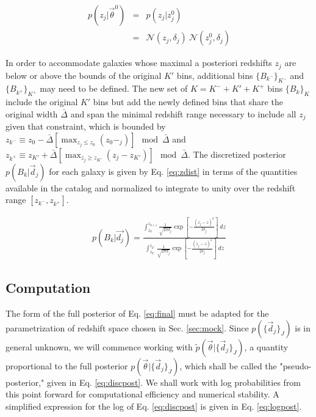 \documentclass[preprint]{aastex}
\begin{document}
\begin{eqnarray}
\label{eq:interim}
p(z_{j}|\vec{\theta}^{0}) &=& p(z_{j}|z^{0}_{j})\\
&=& \mathcal{N}(z_{j},\delta_{j})\ \mathcal{N}(z_{j}^{0},\delta_{j})
\end{eqnarray}

In order to accommodate galaxies whose maximal a posteriori redshifts $z_{j}$ are below or above the bounds of the original $K'$ bins, additional bins $\{B_{k^{-}}\}_{K^{-}}$ and $\{B_{k^{+}}\}_{K^{+}}$ may need to be defined.  The new set of $K=K^{-}+K'+K^{+}$ bins $\{B_{k}\}_{K}$ include the original $K'$ bins but add the newly defined bins that share the original width $\bar{\Delta}$ and span the minimal redshift range necessary to include all $z_{j}$ given that constraint, which is bounded by $z_{k^{-}}\equiv z_{0}-\bar{\Delta}[\max_{z_{j}\leq z_{0}}(z_{0}-_{j})]\mod\bar{\Delta}$ and $z_{k^{+}}\equiv z_{K'}+\bar{\Delta}[\max_{z_{j}\geq z_{K'}}(z_{j}-z_{K'})]\mod\bar{\Delta}$.  The discretized posterior $p(B_{k}|\vec{d}_{j})$ for each galaxy is given by Eq. \ref{eq:zdist} in terms of the quantities available in the catalog and normalized to integrate to unity over the redshift range $[z_{k^{-}},z_{k^{+}}]$.  

\begin{eqnarray}
\label{eq:zdist}
p(B_{k}|\vec{d_{j}}) = \frac{\int_{z_{k}}^{z_{k+1}} \frac{1}{\sqrt{2\pi\delta_{j}}}\exp\left[-\frac{(z_{j}-z)^{2}}{2\delta_{j}}\right]\ dz}{\int_{z_{k^{-}}}^{z_{k^{+}}} \frac{1}{\sqrt{2\pi\delta_{j}}}\exp\left[-\frac{(z_{j}-z)^{2}}{2\delta_{j}}\right]\ dz}
\end{eqnarray}

\clearpage
\subsection{Computation}
\label{sec:mcmc}

The form of the full posterior of Eq. \ref{eq:final} must be adapted for the parametrization of redshift space chosen in Sec. \ref{sec:mock}.  Since $p(\{\vec{d}_{j}\}_{J})$ is in general unknown, we will commence working with $\tilde{p}(\vec{\theta}|\{\vec{d}_{j}\}_{J})$, a quantity proportional to the full posterior $p(\vec{\theta}|\{\vec{d}_{j}\}_{J})$, which shall be called the "pseudo-posterior," given in Eq. \ref{eq:discpost}.  We shall work with log probabilities from this point forward for computational efficiency and numerical stability.  A simplified expression for the log of Eq. \ref{eq:discpost} is given in Eq. \ref{eq:logpost}.
\end{document}
